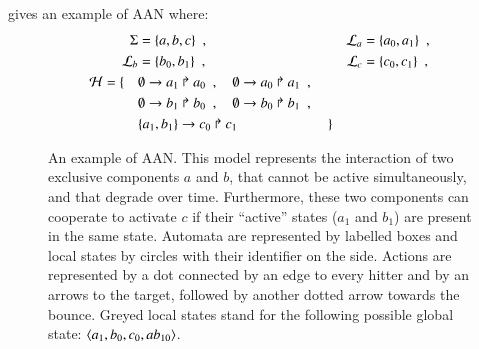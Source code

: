 \begin{example}
   gives an example of AAN where:
  \begin{align*}
    \Sigma &= \{ a, b, c \} \enspace,
      & \mathcal{L}_a &= \{ a_0, a_1 \} \enspace, \\
    \mathcal{L}_b &= \{ b_0, b_1 \} \enspace,
      & \mathcal{L}_c &= \{ c_0, c_1 \} \enspace, \\
    \mathcal{H} = \{ \quad
      & \emptyset\rightarrow a_1\Rsh a_0 \enspace , \quad
        \emptyset\rightarrow a_0\Rsh a_1 \enspace , \\
      & \emptyset\rightarrow b_1\Rsh b_0 \enspace , \quad
        \emptyset\rightarrow b_0\Rsh b_1 \enspace , \\
      & \{a_1, b_1\}\rightarrow c_0\Rsh c_1 \enspace \quad \qquad \qquad
      \quad \}
  \end{align*}

\begin{figure}[tb]
  \centering
  \caption{%
  \label{fig:ph-livelock}%
    An example of AAN.
    This model represents the interaction of two exclusive components $a$ and $b$,
    that cannot be active simultaneously, and that degrade over time.
    Furthermore, these two components can cooperate to activate $c$
    if their “active” states ($a_1$ and $b_1$)
    are present in the same state.
    Automata are represented by labelled boxes
    and local states by circles with their identifier on the side.
    Actions are represented by a dot connected by an edge to every hitter
    and by an arrows to the target, followed by another dotted arrow towards the bounce.
    Greyed local states stand for the following possible global state:
    $\mbox{$\langle a_1, b_0, c_0, ab_{10} \rangle$}$.
  }
\end{figure}

\end{example}



